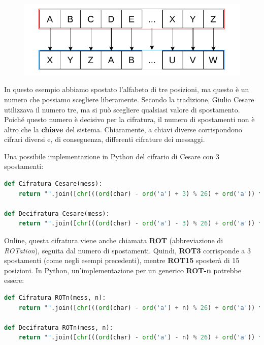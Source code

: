 \documentclass{report}
\begin{document}
\begin{figure}[h]
    \centering
    \includegraphics[width=0.8\linewidth]{logos/1_3_cripto.pdf}
\end{figure}


\newpage

In questo esempio abbiamo spostato l'alfabeto di tre posizioni, ma questo è un numero che possiamo scegliere liberamente.  
Secondo la tradizione, Giulio Cesare utilizzava il numero tre, ma si può scegliere qualsiasi valore di spostamento.  
Poiché questo numero è decisivo per la cifratura, il numero di spostamenti non è altro che la \textbf{chiave} del sistema.  
Chiaramente, a chiavi diverse corrispondono cifrari diversi e, di conseguenza, differenti cifrature dei messaggi.


Una possibile implementazione in Python del cifrario di Cesare con 3 spostamenti:

\begin{lstlisting}[language=Python]
def Cifratura_Cesare(mess):
    return "".join([chr(((ord(char) - ord('a') + 3) % 26) + ord('a')) for a in mess])

def Decifratura_Cesare(mess):
    return "".join([chr(((ord(char) - ord('a') - 3) % 26) + ord('a')) for a in mess])
\end{lstlisting}


Online, questa cifratura viene anche chiamata \textbf{ROT} (abbreviazione di \textit{ROTation}), seguita dal numero di spostamenti.  
Quindi, \textbf{ROT3} corrisponde a 3 spostamenti (come negli esempi precedenti), mentre \textbf{ROT15} sposterà di 15 posizioni.  
In Python, un'implementazione per un generico \textbf{ROT-n} potrebbe essere:


\begin{lstlisting}[language=Python]
def Cifratura_ROTn(mess, n):
    return "".join([chr(((ord(char) - ord('a') + n) % 26) + ord('a')) for a in mess])

def Decifratura_ROTn(mess, n):
    return "".join([chr(((ord(char) - ord('a') - n) % 26) + ord('a')) for a in mess])
\end{lstlisting}
\end{document}
